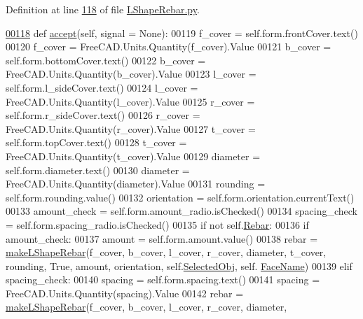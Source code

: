 Definition at line \hyperlink{LShapeRebar_8py_source_l00118}{118} of file \hyperlink{LShapeRebar_8py_source}{L\+Shape\+Rebar.\+py}.


\begin{DoxyCode}
\hypertarget{classLShapeRebar_1_1__LShapeRebarTaskPanel.tex_l00118}{}\hyperlink{classLShapeRebar_1_1__LShapeRebarTaskPanel_a4d62ad224c06875ec721ba9acbdea774}{00118}     \textcolor{keyword}{def }\hyperlink{classLShapeRebar_1_1__LShapeRebarTaskPanel_a4d62ad224c06875ec721ba9acbdea774}{accept}(self, signal = None):
00119         f\_cover = self.form.frontCover.text()
00120         f\_cover = FreeCAD.Units.Quantity(f\_cover).Value
00121         b\_cover = self.form.bottomCover.text()
00122         b\_cover = FreeCAD.Units.Quantity(b\_cover).Value
00123         l\_cover = self.form.l\_sideCover.text()
00124         l\_cover = FreeCAD.Units.Quantity(l\_cover).Value
00125         r\_cover = self.form.r\_sideCover.text()
00126         r\_cover = FreeCAD.Units.Quantity(r\_cover).Value
00127         t\_cover = self.form.topCover.text()
00128         t\_cover = FreeCAD.Units.Quantity(t\_cover).Value
00129         diameter = self.form.diameter.text()
00130         diameter = FreeCAD.Units.Quantity(diameter).Value
00131         rounding = self.form.rounding.value()
00132         orientation = self.form.orientation.currentText()
00133         amount\_check = self.form.amount\_radio.isChecked()
00134         spacing\_check = self.form.spacing\_radio.isChecked()
00135         \textcolor{keywordflow}{if} \textcolor{keywordflow}{not} self.\hyperlink{classLShapeRebar_1_1__LShapeRebarTaskPanel_a4a64ebfb73de83fd42f3a349272e69c7}{Rebar}:
00136             \textcolor{keywordflow}{if} amount\_check:
00137                 amount = self.form.amount.value()
00138                 rebar = \hyperlink{namespaceLShapeRebar_a647a28e94933108c6617da8532d76998}{makeLShapeRebar}(f\_cover, b\_cover, l\_cover, r\_cover, diameter, 
      t\_cover, rounding, \textcolor{keyword}{True}, amount, orientation, self.\hyperlink{classLShapeRebar_1_1__LShapeRebarTaskPanel_a71f1ee825528164c18315a0234f6da5d}{SelectedObj}, self.
      \hyperlink{classLShapeRebar_1_1__LShapeRebarTaskPanel_a8f624818baf68844984b3368f27dc421}{FaceName})
00139             \textcolor{keywordflow}{elif} spacing\_check:
00140                 spacing = self.form.spacing.text()
00141                 spacing = FreeCAD.Units.Quantity(spacing).Value
00142                 rebar = \hyperlink{namespaceLShapeRebar_a647a28e94933108c6617da8532d76998}{makeLShapeRebar}(f\_cover, b\_cover, l\_cover, r\_cover, diameter, 

\end{DoxyCode}
